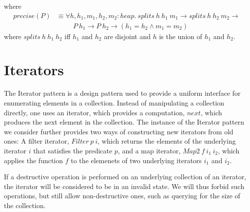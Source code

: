\documentclass[a4paper,english]{article}
\newcommand{\HEAP}[0]{heap}
\begin{document}
where
\begin{align*}
precise(P) &\equiv \forall h, h_1, m_1, h_2, m_2 : \HEAP.\ splits\ h\ h_1\ m_1 \rightarrow splits\ h\ h_2\ m_2 \rightarrow\\
&\quad\quad\ \ P\ h_1 \rightarrow P\ h_2 \rightarrow (h_1 = h_2 \land m_1 = m_2)
\end{align*}
where $splits\ h\ h_1\ h_2$ iff $h_1$ and $h_2$ are disjoint and $h$ is the
union of $h_1$ and $h_2$.

\section{Iterators}

The Iterator pattern is a design pattern used to provide a uniform interface
for enumerating elements in a collection. Instead of manipulating a collection
directly, one uses an iterator, which provides a computation, $next$, which
produces the next element in the collection. The instance of the Iterator
pattern we consider further provides two ways of constructing new iterators
from old ones: A filter iterator, $Filter\ p\ i$, which returns the elements of
the underlying iterator $i$ that satisfies the predicate $p$, and a map
iterator, $Map2\ f\ i_1\ i_2$, which applies the function $f$ to the elemenets
of two underlying iterators $i_1$ and $i_2$. 

If a destructive operation is performed on an underlying collection of an
iterator, the iterator will be considered to be in an invalid state. We will
thus forbid such operations, but still allow non-destructive ones, such as
querying for the size of the collection.
\end{document}
